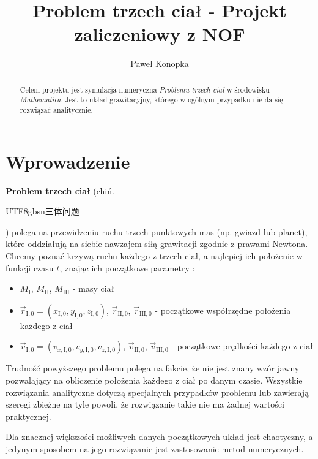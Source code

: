 \documentclass{article}
\title{Problem trzech ciał - Projekt zaliczeniowy z NOF}
\author{Paweł Konopka}
\begin{document}
\maketitle

\begin{abstract}
Celem projektu jest symulacja numeryczna \textit{Problemu trzech ciał} w środowisku \mbox{\textit{Mathematica}\footnotemark}. Jest to układ grawitacyjny, którego w ogólnym przypadku nie da się rozwiązać analitycznie.
\end{abstract}


\section{Wprowadzenie}
\textbf{Problem trzech ciał} (chiń. \begin{CJK*}{UTF8}{gbsn}三体问题\end{CJK*}) polega na przewidzeniu ruchu trzech punktowych mas (np. gwiazd lub planet), które oddziałują na siebie nawzajem siłą grawitacji zgodnie z prawami Newtona. Chcemy poznać krzywą ruchu każdego z trzech ciał, a najlepiej ich położenie w funkcji czasu $t$, znając ich początkowe parametry  \cite{gowers08_specific}:
\begin{itemize}
    \item $M_{\mathrm{I}}$, $M_{\mathrm{II}}$, $M_{\mathrm{III}}$ - masy ciał
    \item $\vec{r}_{\mathrm{I}, 0} = (x_{\mathrm{I}, 0}, y_{\mathrm{I}, 0}, z_{\mathrm{I}, 0})$, $\vec{r}_{\mathrm{II}, 0}$, $\vec{r}_{\mathrm{III}, 0}$  - początkowe współrzędne położenia każdego z ciał
    \item $\vec{v}_{\mathrm{I}, 0} = (v_{x, \mathrm{I}, 0}, v_{y, \mathrm{I}, 0}, v_{z, \mathrm{I}, 0})$, $\vec{v}_{\mathrm{II}, 0}$, $\vec{v}_{\mathrm{III}, 0}$  - początkowe prędkości każdego z ciał
\end{itemize}

Trudność powyższego problemu polega na fakcie, że nie jest znany wzór jawny pozwalający na obliczenie położenia każdego z ciał po danym czasie. Wszystkie rozwiązania analityczne dotyczą specjalnych przypadków problemu lub zawierają szeregi zbieżne na tyle powoli, że rozwiązanie takie nie ma żadnej wartości praktycznej.

Dla znacznej większości możliwych danych początkowych układ jest chaotyczny, a jedynym sposobem na jego rozwiązanie jest zastosowanie metod numerycznych.
\end{document}

